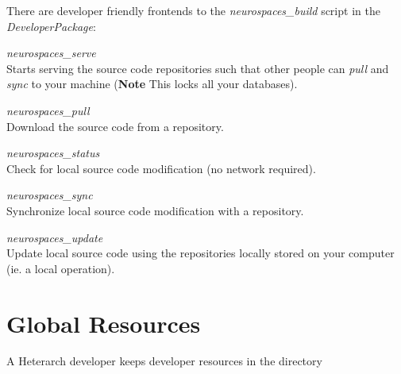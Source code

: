 \documentclass[12pt]{article}
\begin{document}


There are developer friendly frontends to the {\it neurospaces\_build} script in the {\it DeveloperPackage}:
\begin{description}
\item {\it neurospaces\_serve}\\
Starts serving the source code repositories such that other people can {\it pull} and {\it sync} to your machine ({\bf Note} This locks all your databases).
\item {\it neurospaces\_pull}\\
Download the source code from a repository.
\item {\it neurospaces\_status}\\
Check for local source code modification (no network required).
\item {\it neurospaces\_sync}\\
Synchronize local source code modification with a repository.
\item {\it neurospaces\_update}\\
Update local source code using the repositories locally stored on your computer (ie. a local operation). 
\end{description}

\section*{Global Resources}

A Heterarch developer keeps developer resources in the directory
\end{document}
